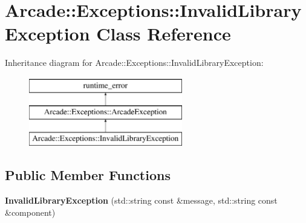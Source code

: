 \hypertarget{classArcade_1_1Exceptions_1_1InvalidLibraryException}{}\section{Arcade\+::Exceptions\+::Invalid\+Library\+Exception Class Reference}
\label{classArcade_1_1Exceptions_1_1InvalidLibraryException}
Inheritance diagram for Arcade\+::Exceptions\+::Invalid\+Library\+Exception\+:\begin{figure}[H]
\begin{center}
\leavevmode
\includegraphics[height=3.000000cm]{classArcade_1_1Exceptions_1_1InvalidLibraryException}
\end{center}
\end{figure}
\subsection*{Public Member Functions}
\begin{DoxyCompactItemize}
\item 
\mbox{\label{classArcade_1_1Exceptions_1_1InvalidLibraryException_ae3325fe59ba1cace4e7ef32db01ab790}} 
{\bfseries Invalid\+Library\+Exception} (std\+::string const \&message, std\+::string const \&component)
\end{DoxyCompactItemize}
